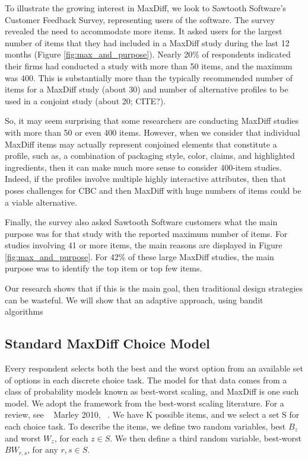 \documentclass[a4paper,12pt]{article}
\begin{document}
To illustrate the growing interest in MaxDiff, we look to Sawtooth Software's Customer Feedback Survey, representing users of the software. The survey revealed the need to accommodate more items. It asked users for the largest number of items that they had included in a MaxDiff study during the last 12 months (Figure \ref{fig:max_and_purpose}). Nearly 20\% of respondents indicated their firms had conducted a study with more than 50 items, and the maximum was 400. This is substantially more than the typically recommended number of items for a MaxDiff study (about 30) and number of alternative profiles to be used in a conjoint study (about 20; CITE?).

So, it may seem surprising that some researchers are conducting MaxDiff studies with more than 50 or even 400 items.  However, when we consider that individual MaxDiff items may actually represent conjoined elements that constitute a profile, such as, a combination of packaging style, color, claims, and highlighted ingredients, then it can make much more sense to consider 400-item studies.  Indeed, if the profiles involve multiple highly interactive attributes, then that poses challenges for CBC and then MaxDiff with huge numbers of items could be a viable alternative.

Finally, the survey also asked Sawtooth Software customers what the main purpose was for that study with the reported maximum number of items. For studies involving 41 or more items, the main reasons are displayed in Figure \ref{fig:max_and_purpose}. For 42\% of these large MaxDiff studies, the main purpose was to identify the top item or top few items.  

Our research shows that if this is the main goal, then traditional design strategies can be wasteful. We will show that an adaptive approach, using bandit algorithms



\subsection{Standard MaxDiff Choice Model}

Every respondent selects both the best and the worst option from an available set of options in each discrete choice task. The model for that data comes from a class of probability models known as best-worst scaling, and MaxDiff is one such model. We adopt the framework from the best-worst scaling literature. For a review, see ~\cite{marley2012models} Marley 2010, ~\cite{marley2005some}. 
We have K possible items, and we select a set S for each choice task. To describe the items, we define two random variables, best $B_z$ and worst $W_z$, for each $z \in S$.  We then define a third random variable, best-worst $BW_{r,s}$, for any $r,s \in S$.
\end{document}
